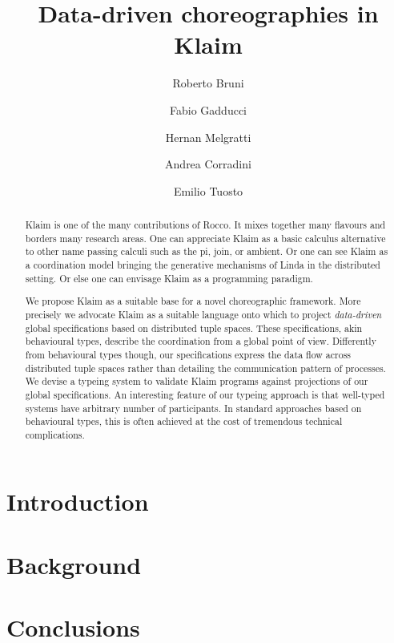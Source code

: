 \documentclass[runningheads,a4paper]{llncs}
\begin{document}
\mainmatter  %

\title{
  Data-driven choreographies in Klaim
}


%
%

\author{
  Roberto Bruni  \and
  Fabio Gadducci  \and
  Hernan Melgratti  \and
  Andrea Corradini  \and
  Emilio Tuosto
}


\maketitle

\begin{abstract}
  Klaim is one of the many contributions of Rocco.
  It mixes together many flavours and borders many research areas.
  One can appreciate Klaim as a basic calculus alternative to other
  name passing calculi such as the pi, join, or ambient.
  Or one can see Klaim as a coordination model bringing the generative
  mechanisms of Linda in the distributed setting.
  Or else one can envisage Klaim as a programming paradigm.

  We propose Klaim as a suitable base for a novel choreographic
  framework.
  More precisely we advocate Klaim as a suitable language onto which
  to project \emph{data-driven} global specifications based on
  distributed tuple spaces.
  These specifications, akin behavioural types, describe the coordination
  from a global point of view.
  Differently from behavioural types though, our specifications
  express the data flow across distributed tuple spaces rather than
  detailing the communication pattern of processes.
  We devise a typeing system to validate Klaim programs against projections
  of our global specifications.
  An interesting feature of our typeing approach is that well-typed
  systems have arbitrary number of participants.
  In standard approaches based on behavioural types, this is often
  achieved at the cost of tremendous technical complications.
\end{abstract}

\section{Introduction}
\label{sec:intro}



\section{Background}
\label{sec:background}


\section{Conclusions}
\label{sec:disc}\label{sec:conc}




\end{document}
